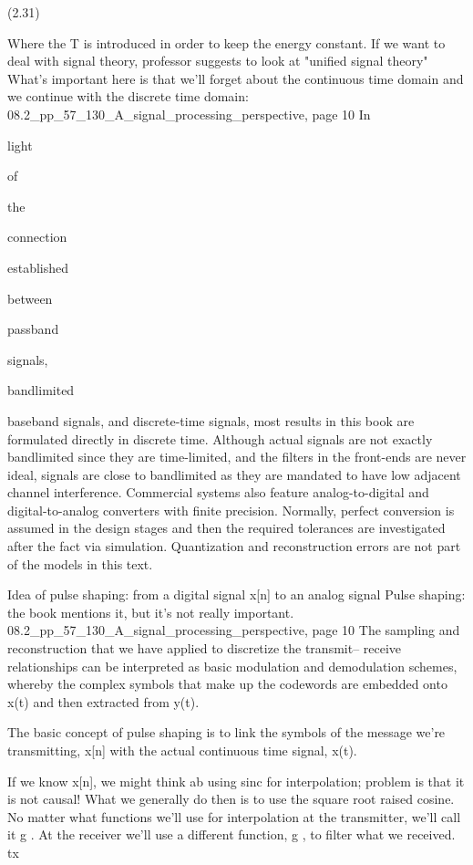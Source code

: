 {(2.31)

Where the T is introduced in order to keep the energy constant.
If we want to deal with signal theory, professor suggests to look at "unified signal theory"
What's important here is that we'll forget about the continuous time domain and we continue with the discrete time domain:
08.2_pp_57_130_A_signal_processing_perspective, page 10 In

light

of

the

connection

established

between

passband

signals,

bandlimited

baseband signals, and discrete-time signals, most results in this book are formulated directly in discrete time. Although actual signals are not exactly bandlimited since they are time-limited, and the filters in the front-ends are never ideal, signals are close to bandlimited as they are mandated to have low adjacent channel interference.
Commercial systems also feature analog-to-digital and digital-to-analog converters with finite precision. Normally, perfect conversion is assumed in the design stages and then the required tolerances are investigated after the fact via simulation.
Quantization and reconstruction errors are not part of the models in this text.

Idea of pulse shaping: from a digital signal x[n] to an analog signal Pulse shaping: the book mentions it, but it's not really important.
08.2_pp_57_130_A_signal_processing_perspective, page 10 The sampling and reconstruction that we have applied to discretize the transmit–
receive relationships can be interpreted as basic modulation and demodulation schemes, whereby the complex symbols that make up the codewords are embedded onto x(t) and then extracted from y(t).

The basic concept of pulse shaping is to link the symbols of the message we're transmitting, x[n] with the actual continuous time signal, x(t).

If we know x[n], we might think ab using sinc for interpolation; problem is that it is not causal!
What we generally do then is to use the square root raised cosine.
No matter what functions we'll use for interpolation at the transmitter, we'll call it g .
At the receiver we'll use a different function, g , to filter what we received.
tx

}
